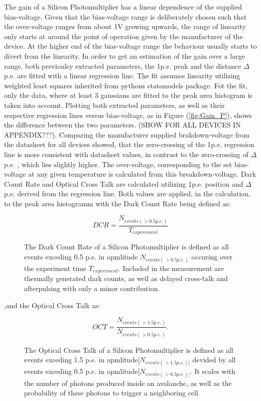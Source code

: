 \documentclass[article,type=msc,colorback,accentcolor=tud9c]{tudthesis}
\begin{document}
The gain of a Silicon Photomultiplier has a linear dependence of the supplied bias-voltage. Given that the bias-voltage range is deliberately chosen such that the over-voltage ranges from about 1V growing upwards, the range of linearity only starts at around the point of operation given by the manufacturer of the device. At the higher end of the bias-voltage range the behaviour usually starts to divert from the linearity. In order to get an estimation of the gain over a large range, both previoulsy extracted parameters, the 1p.e. peak and the distance $\Delta$p.e. are fitted with a linear regression line. The fit assumes linearity utilizing weighted least squares inherited from pythons statsmodels package. Fot the fit, only the data, where at least 3 gaussians are fitted to the peak area histogram is taken into account. Plotting both extracted parameters, as well as their respective regression lines versus bias-voltage, as in Figure (\ref{fig:Gain_P}), shows the difference between the two parameters. (SHOW FOR ALL DEVICES IN APPENDIX???). Comparing the manufacturer supplied brakdown-voltage from the datasheet for all devices showed, that the zero-crossing of the 1p.e. regression line is more consistent with datasheet values, in contrast to the zero-crossing of $\Delta$p.e. , which lies slightly higher. The over-voltage, corresponding to the set bias-voltage at any given temperature is calculated from this breakdown-voltage. 
Dark Count Rate and Optical Cross Talk are calculated utilizing 1p.e. position and $\Delta$p.e. derived from the regression line. Both values are applied, in the calculation, to the peak area histogramm with the Dark Count Rate being defined as:

\begin{figure}[h]
\begin{equation}
DCR = \frac{N_{events(>0.5p.e.)}}{T_{experiment}}
\end{equation}
\label{DCR_eq}
\caption{The Dark Count Rate of a Silicon Photomultiplier is defined as all events exceding 0.5 p.e. in apmlitude $N_{events(>0.5p.e.)}$ occuring over the experiment time $T_{experiment}$. Included in the measurement are thermally generated dark counts, as well as delayed cross-talk and afterpulsing with only a minor contribution.}
\end{figure}
,and the Optical Cross Talk as:
\begin{figure}[h]
\begin{equation}
OCT = \frac{N_{events(>1.5p.e.)}}{N_{events(>0.5p.e.)}}.
\end{equation}
\label{OCT_eq}
\caption{The Optical Cross Talk of a Silicon Photomultiplier is defined as all events exceding 1.5 p.e. in apmlitude$[N_{events(>1.5p.e.)]}$ devided by all events exceding 0.5 p.e. in apmlitude$[N_{events(>0.5p.e.)]}$. It scales with the number of photons produced inside an avalanche, as well as the probability of these photons to trigger a neighboring cell}
\end{figure}
\end{document}
